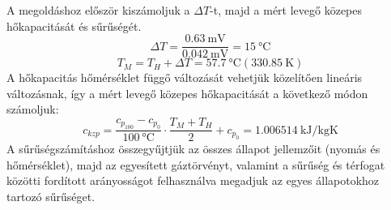 \pagebreak
\noindent A megoldáshoz először kiszámoljuk a $\Delta T$-t, majd a mért levegő közepes hőkapacitását és sűrűségét.
\begin{equation*}
\Delta T=\dfrac{\SI{0.63}{\milli\volt}}{\SI{0.042}{\milli\volt}}=\SI{15}{\celsius}
\end{equation*}
\begin{equation*}
T_{M}=T_{H}+ \Delta T = \SI{57.7}{\celsius} ( \SI{330,85}{\kelvin})
\end{equation*}
\noindent A hőkapacitás hőmérséklet függő változását vehetjük közelítően lineáris változásnak, így a mért levegő közepes hőkapacitását a következő módon számoljuk:
\begin{equation*}
c_{kzp}=\dfrac{c_{p_{100}}-c_{p_{0}}}{\SI{100}{\celsius}} \cdot \dfrac{T_{M}+T_{H}}{2} + c_{p_{0}}= \SI{1.006514}{\kilo\joule\per\kilo\gram\kelvin}
\end{equation*}
\noindent A sűrűségszámításhoz összegyűjtjük az összes állapot jellemzőit (nyomás és hőmérséklet), majd az egyesített gáztörvényt, valamint a sűrűség és térfogat közötti fordított arányosságot felhasználva megadjuk az egyes állapotokhoz tartozó sűrűséget. 

